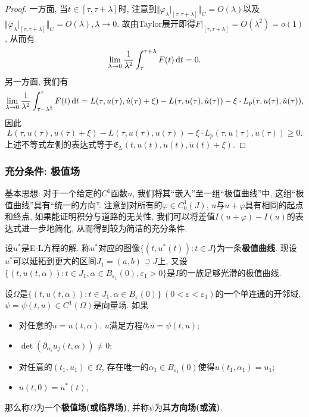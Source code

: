 \begin{proposition}[必要条件]
\begin{proof}
    一方面, 当$t \in [\tau, \tau + \lambda]$时, 注意到$\Vert \varphi_{\lambda}|_{[\tau, \tau + \lambda]}\Vert_C = O(\lambda)$以及$\Vert \dot\varphi_{\lambda}|_{[\tau, \tau + \lambda]}\Vert_C = O(\lambda), \lambda \rightarrow 0$.
    故由Taylor展开即得$F|_{[\tau, \tau + \lambda]} = O(\lambda^2) = o(1)$, 从而有 
    \begin{equation*}
        \lim\limits_{\lambda \rightarrow 0}\frac{1}{\lambda^2}\int_{\tau}^{\tau + \lambda} F(t) \,{\rm d}t = 0.
    \end{equation*}
    另一方面, 我们有 
    \begin{equation*}
        \lim\limits_{\lambda \rightarrow 0}\frac{1}{\lambda^2}\int_{\tau - \lambda^2}^{\tau} F(t) \,{\rm d}t = L(\tau, u(\tau), \dot u(\tau) + \xi) - L(\tau, u(\tau), \dot u(\tau)) - \xi\cdot L_p(\tau, u(\tau), \dot u(\tau)),
    \end{equation*}
    因此
    \begin{equation*}
        L(\tau, u(\tau), \dot u(\tau) + \xi) - L(\tau, u(\tau), \dot u(\tau)) - \xi \cdot L_p(\tau, u(\tau), \dot u(\tau)) \geq 0. 
    \end{equation*}
    上述不等式左侧的表达式等于$\mathfrak{E}_L(t, u(t), \dot u(t), \dot u(t) + \xi)$. 
    \end{proof}
\end{proposition}

\subsubsection{充分条件: 极值场}

基本思想: 对于一个给定的$C^1$函数$u$, 我们将其``嵌入''至一组``极值曲线''中, 这组``极值曲线''具有``统一的方向''.
注意到对所有的$\varphi \in C_0^1(J)$, $u$与$u + \varphi$具有相同的起点和终点, 如果能证明积分与道路的无关性, 我们可以将差值$I(u + \varphi) - I(u)$的表达式进一步地简化, 从而得到较为简洁的充分条件.

设$u^*$是E-L方程的解. 称$u^*$对应的图像$\{(t, u^*(t)) \colon t \in J\}$为一条\textbf{极值曲线}.
现设$u^*$可以延拓到更大的区间$J_1 = (a, b) \supseteq J$上, 又设$\{(t, u(t, \alpha))\colon t \in J_1, \alpha \in B_{\varepsilon_1}(0), \varepsilon_1 > 0\}$是$I$的一族足够光滑的极值曲线.

\begin{definition}
    设$\Omega$是$\{(t, u(t, \alpha))\colon t \in J_1, \alpha \in B_{\varepsilon}(0)\} \ (0 < \varepsilon < \varepsilon_1)$的一个单连通的开邻域, $\psi = \psi(t, u) \in C^1(\Omega)$是向量场.
    如果 
    \begin{itemize}
        \item 对任意的$u = u(t, \alpha)$, $u$满足方程$\partial_tu = \psi(t, u)$;
        \item $\det (\partial_{\alpha_i}u_j(t, \alpha)) \neq 0$;
        \item 对任意的$(t_1, u_1) \in \Omega$, 存在唯一的$\alpha_1 \in B_{\varepsilon_1}(0)$使得$u(t_1, \alpha_1) = u_1$;
        \item $u(t, 0) = u^*(t)$,
    \end{itemize}
    那么称$\Omega$为一个\textbf{极值场(或临界场)}, 并称$\psi$为其\textbf{方向场(或流)}.
\end{definition}

